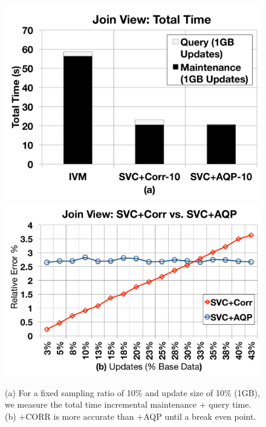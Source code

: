 \begin{figure}[t]
\centering
 \includegraphics[scale=0.13]{exp/msj_4.pdf}
 \includegraphics[scale=0.13]{exp/msj_6.pdf}
  \caption{(a) For a fixed sampling ratio of 10\% and update size of 10\% (1GB), we measure the total time incremental maintenance + query time. (b) \svcnospace+CORR is more accurate than \svcnospace+AQP until a break even point. \vspace{-2em} \label{exp-1-total}}
\end{figure}


